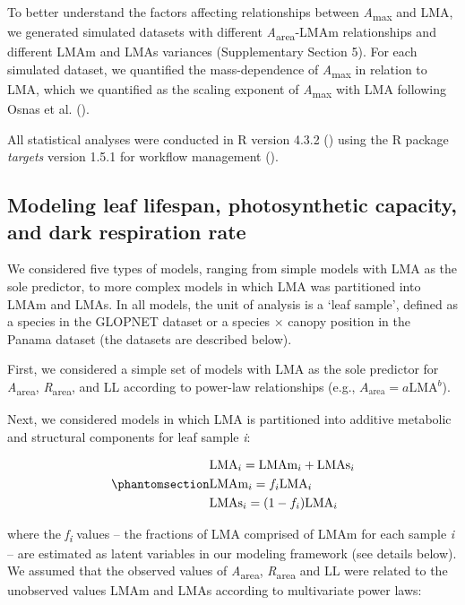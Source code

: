 \documentclass[
  12pt,
  letterpaper,
  DIV=11,
  numbers=noendperiod]{scrartcl}
\begin{document}
To better understand the factors affecting relationships between
\emph{A}\textsubscript{max} and LMA, we generated simulated datasets
with different \emph{A}\textsubscript{area}-LMAm relationships and
different LMAm and LMAs variances (Supplementary Section 5). For each
simulated dataset, we quantified the mass-dependence of
\emph{A}\textsubscript{max} in relation to LMA, which we quantified as
the scaling exponent of \emph{A}\textsubscript{max} with LMA following
Osnas et al. ().

All statistical analyses were conducted in R version 4.3.2
() using the R package
\emph{targets} version 1.5.1 for workflow management
().

\subsection{Modeling leaf lifespan, photosynthetic capacity, and dark
respiration
rate}\label{modeling-leaf-lifespan-photosynthetic-capacity-and-dark-respiration-rate}

We considered five types of models, ranging from simple models with LMA
as the sole predictor, to more complex models in which LMA was
partitioned into LMAm and LMAs. In all models, the unit of analysis is a
`leaf sample', defined as a species in the GLOPNET dataset or a species
\(\times\) canopy position in the Panama dataset (the datasets are
described below).

First, we considered a simple set of models with LMA as the sole
predictor for \emph{A}\textsubscript{area},
\emph{R}\textsubscript{area}, and LL according to power-law
relationships (e.g., \(A_{\mathrm{area}} = a\mathrm{LMA}^b\)).

Next, we considered models in which LMA is partitioned into additive
metabolic and structural components for leaf sample \emph{i}:

\begin{equation}\phantomsection\label{eq-LMA}{
\begin{aligned}
  &\mathrm{LMA}_{i} =\mathrm{LMAm}_{i} + \mathrm{LMAs}_{i} \\
  &\mathrm{LMAm}_{i} = f_{i} \mathrm{LMA}_{i} \\
  &\mathrm{LMAs}_{i} = (1 - f_{i})  \mathrm{LMA}_{i}
\end{aligned}
}\end{equation}

where the \emph{f\textsubscript{i}} values -- the fractions of LMA
comprised of LMAm for each sample \emph{i} -- are estimated as latent
variables in our modeling framework (see details below). We assumed that
the observed values of \emph{A}\textsubscript{area},
\emph{R}\textsubscript{area} and LL were related to the unobserved
values LMAm and LMAs according to multivariate power laws:
\end{document}
